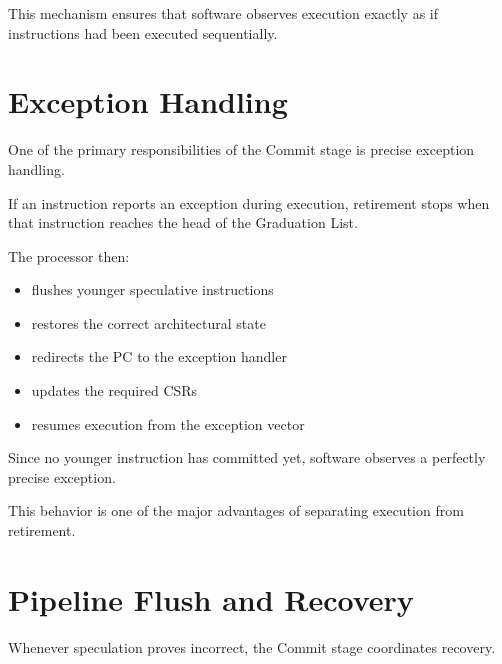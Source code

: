 This mechanism ensures that software observes execution exactly as if instructions had been
executed sequentially.

\begin{rtlrefs}
\end{rtlrefs}

\section{Exception Handling}

One of the primary responsibilities of the Commit stage is precise exception handling.

If an instruction reports an exception during execution, retirement stops when that instruction
reaches the head of the Graduation List.

The processor then:
\begin{itemize}
  \item flushes younger speculative instructions
  \item restores the correct architectural state
  \item redirects the PC to the exception handler
  \item updates the required CSRs
  \item resumes execution from the exception vector
\end{itemize}

Since no younger instruction has committed yet, software observes a perfectly precise
exception.

This behavior is one of the major advantages of separating execution from retirement.

\begin{rtlrefs}
\end{rtlrefs}

\section{Pipeline Flush and Recovery}

Whenever speculation proves incorrect, the Commit stage coordinates recovery.

